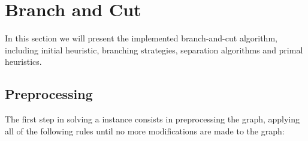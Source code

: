 
\section{Branch and Cut}
\label{sec:bnc}

In this section we will present the implemented branch-and-cut algorithm, including initial heuristic, branching strategies, separation algorithms and primal heuristics.

\subsection{Preprocessing}

The first step in solving a \PCP instance consists in preprocessing the graph, applying all of the following rules until no more modifications are made to the graph:

